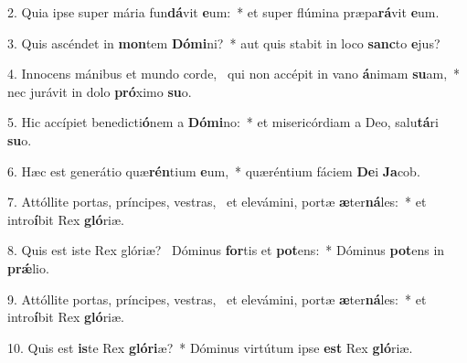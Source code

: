2. Quia ipse super mária fun\textbf{dá}vit \textbf{e}um:~*  et super flúmina præpa\textbf{rá}vit \textbf{e}um.\

3. Quis ascéndet in \textbf{mon}tem \textbf{Dó}\textbf{mi}ni?~*  aut quis stabit in loco \textbf{sanc}to \textbf{e}jus?\

4. Innocens mánibus et mundo corde, \dag\  qui non accépit in vano \textbf{á}nimam \textbf{su}am,~*  nec jurávit in dolo \textbf{pró}ximo \textbf{su}o.\

5. Hic accípiet benedicti\textbf{ó}nem a \textbf{Dó}\textbf{mi}no:~*  et misericórdiam a Deo, salu\textbf{tá}ri \textbf{su}o.\

6. Hæc est generátio quæ\textbf{rén}tium \textbf{e}um,~*  quæréntium fáciem \textbf{De}i \textbf{Ja}cob.\

7. Attóllite portas, príncipes, vestras, \dag\  et elevámini, portæ \textbf{æ}ter\textbf{ná}les:~*  et intro\textbf{í}bit Rex \textbf{gló}riæ.\

8. Quis est iste Rex glóriæ? \dag\  Dóminus \textbf{for}tis et \textbf{pot}ens:~*  Dóminus \textbf{pot}ens in \textbf{prǽ}lio.\

9. Attóllite portas, príncipes, vestras, \dag\  et elevámini, portæ \textbf{æ}ter\textbf{ná}les:~*  et intro\textbf{í}bit Rex \textbf{gló}riæ.\

10. Quis est \textbf{is}te Rex \textbf{gló}\textbf{ri}æ?~*  Dóminus virtútum ipse \textbf{est} Rex \textbf{gló}riæ.\


